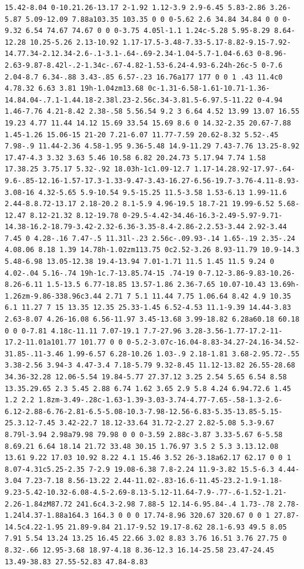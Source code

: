 \documentclass[11pt]{article}
\begin{document}
\begin{enumerate}
\begin{verbatim}
15.42-8.04 0-10.21.26-13.17 2-1.92 1.12-3.9 2.9-6.45 5.83-2.86 3.26-5.87 5.09-12.09 7.88a103.35 103.35 0 0 0-5.62 2.6 34.84 34.84 0 0 0-9.32 6.54 74.67 74.67 0 0 0-3.75 4.05l-1.1 1.24c-5.28 5.95-8.29 8.64-12.28 10.25-5.26 2.13-10.92 1.17-17.5-3.48-7.33-5.17-8.82-9.15-7.92-14.77.34-2.12.34-2.6-.1-3.1-.64-.69-2.34-1.04-5.7-1.04-6.63 0-8.96-2.63-9.87-8.42l-.2-1.34c-.67-4.82-1.53-6.24-4.93-6.24h-26c-5 0-7.6 2.04-8.7 6.34-.88 3.43-.85 6.57-.23 16.76a177 177 0 0 1 .43 11.4c0 4.78.32 6.63 3.81 19h-1.04zm13.68 0c-1.31-6.58-1.61-10.71-1.36-14.84.04-.7.1-1.44.18-2.38l.23-2.56c.34-3.81.5-6.97.5-11.22 0-4.94 1.46-7.76 4.21-8.42 2.38-.58 5.56.54 9.2 3 6.64 4.52 13.99 13.07 16.55 19.23 4.77 11.44 14.12 15.69 33.54 15.69 8.6 0 14.32-2.35 20.67-7.88 1.45-1.26 15.06-15 21-20 7.21-6.07 11.77-7.59 20.62-8.32 5.52-.45 7.98-.9 11.44-2.36 4.58-1.95 9.36-5.48 14.9-11.29 7.43-7.76 13.25-8.92 17.47-4.3 3.32 3.63 5.46 10.58 6.82 20.24.73 5.17.94 7.74 1.58 17.38.25 3.75.17 5.32-.92 18.03h-1c1.09-12.7 1.17-14.28.92-17.97-.64-9.6-.85-12.16-1.57-17.3-1.33-9.47-3.43-16.27-6.56-19.7-3.76-4.11-8.93-3.08-16 4.32-5.65 5.9-10.54 9.5-15.25 11.5-3.58 1.53-6.13 1.99-11.6 2.44-8.8.72-13.17 2.18-20.2 8.1-5.9 4.96-19.5 18.7-21 19.99-6.52 5.68-12.47 8.12-21.32 8.12-19.78 0-29.5-4.42-34.46-16.3-2.49-5.97-9.71-14.38-16.2-18.79-3.42-2.32-6.36-3.35-8.4-2.86-2.2.53-3.44 2.92-3.44 7.45 0 4.28-.16 7.47-.5 11.31l-.23 2.56c-.09.93-.14 1.65-.19 2.35-.24 4.08.06 8.18 1.39 14.78h-1.02zm113.75 0c2.52-3.26 8.93-11.79 10.9-14.3 5.48-6.98 13.05-12.38 19.4-13.94 7.01-1.71 11.5 1.45 11.5 9.24 0 4.02-.04 5.16-.74 19h-1c.7-13.85.74-15 .74-19 0-7.12-3.86-9.83-10.26-8.26-6.11 1.5-13.5 6.77-18.85 13.57-1.86 2.36-7.65 10.07-10.43 13.69h-1.26zm-9.86-338.96c3.44 2.71 7 5.1 11.44 7.75 1.06.64 8.42 4.9 10.35 6.1 11.27 7 15 13.35 12.35 25.33-1.45 6.52-4.53 11.1-9.39 14.44-3.83 2.63-8.07 4.26-16.08 6.56-11.97 3.45-13.68 3.99-18.82 6.28a60.18 60.18 0 0 0-7.81 4.18c-11.11 7.07-19.1 7.7-27.96 3.28-3.56-1.77-17.2-11-17.2-11.01a101.77 101.77 0 0 0-5.2-3.07c-16.04-8.83-34.27-24.16-34.52-31.85-.11-3.46 1.99-6.57 6.28-10.26 1.03-.9 2.18-1.81 3.68-2.95.72-.55 3.38-2.56 3.94-3 4.47-3.4 7.18-5.79 9.32-8.45 11.12-13.82 26.55-28.68 34.36-32.28 12.06-5.54 19.84-5.77 27.37.12 3.25 2.54 5.65 6.54 8.58 13.35.29.65 2.3 5.45 2.88 6.74 1.62 3.65 2.9 5.8 4.24 6.94.72.6 1.45 1.2 2.2 1.8zm-3.49-.28c-1.63-1.39-3.03-3.74-4.77-7.65-.58-1.3-2.6-6.12-2.88-6.76-2.81-6.5-5.08-10.3-7.98-12.56-6.83-5.35-13.85-5.15-25.3.12-7.45 3.42-22.7 18.12-33.64 31.72-2.27 2.82-5.08 5.3-9.67 8.79l-3.94 2.98a79.98 79.98 0 0 0-3.59 2.88c-3.87 3.33-5.67 6-5.58 8.69.21 6.64 18.14 21.72 33.48 30.15 1.76.97 3.5 2 5.3 3.13.12.08 13.61 9.22 17.03 10.92 8.22 4.1 15.46 3.52 26-3.18a62.17 62.17 0 0 1 8.07-4.31c5.25-2.35 7-2.9 19.08-6.38 7.8-2.24 11.9-3.82 15.5-6.3 4.44-3.04 7.23-7.18 8.56-13.22 2.44-11.02-.83-16.6-11.45-23.2-1.9-1.18-9.23-5.42-10.32-6.08-4.5-2.69-8.13-5.12-11.64-7.9-.77-.6-1.52-1.21-2.26-1.84zM87.72 241.6c4.3-2.98 7.88-5 12.14-6.95.84-.4 1.73-.78 2.78-1.24l4.37-1.88a164.3 164.3 0 0 0 17.74-8.96 320.67 320.67 0 0 1 27.87-14.5c4.22-1.95 21.89-9.84 21.17-9.52 19.17-8.62 28.1-6.93 49.5 8.05 7.91 5.54 13.24 13.25 16.45 22.66 3.02 8.83 3.76 16.51 3.76 27.75 0 8.32-.66 12.95-3.68 18.97-4.18 8.36-12.3 16.14-25.58 23.47-24.45 13.49-38.83 27.55-52.83 47.84-8.83 
\end{verbatim}
\end{enumerate}
\end{document}
